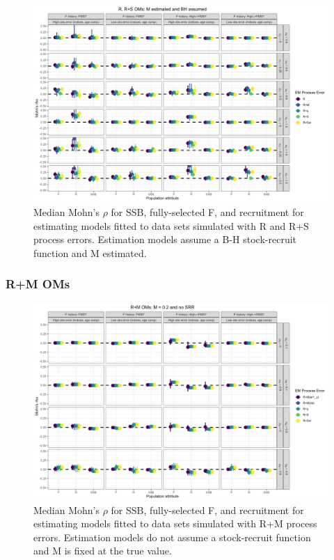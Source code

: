 \documentclass[
  12pt,
]{article}
\begin{document}
\begin{landscape}
\begin{figure}
\caption{Median Mohn's $\rho$ for SSB, fully-selected F, and recruitment for estimating models fitted to data sets simulated with R and R+S process errors.  Estimation models assume a B-H stock-recruit function and M estimated.}\label{naa_om_em_BH_ME_mohns_rho}
\begin{center}
\includegraphics[width = \textwidth]{naa_om_mohns_rho_BH_ME.png}
\end{center}
\end{figure}
\end{landscape}

\hypertarget{rm-oms-1}{%
\subsubsection*{R+M OMs}\label{rm-oms-1}}

\begin{landscape}
\begin{figure}
\caption{Median Mohn's $\rho$ for SSB, fully-selected F, and recruitment for estimating models fitted to data sets simulated with R+M process errors.  Estimation models do not assume a stock-recruit function and M is fixed at the true value.}\label{M_om_em_R_MF_mohns_rho}
\begin{center}
\includegraphics[width = \textwidth]{M_om_mohns_rho_R_MF.png}
\end{center}
\end{figure}
\end{landscape}
\end{document}
